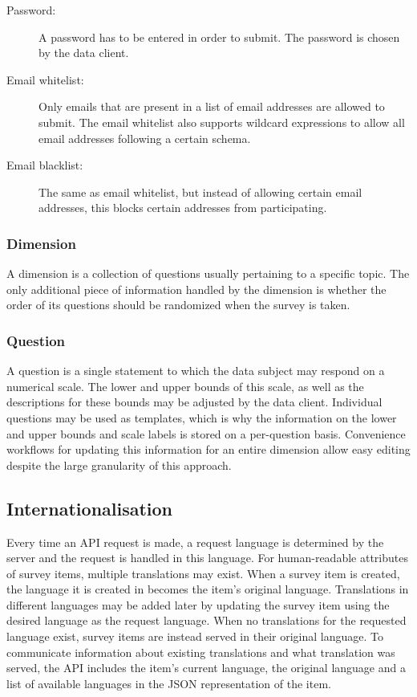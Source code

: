         \begin{description}
            \item[Password:] A password has to be entered in order to submit.
            The password is chosen by the data client.
            \item[Email whitelist:] Only emails that are present in a list
            of email addresses are allowed to submit. The email whitelist
            also supports wildcard expressions to allow all email addresses
            following a certain schema.
            \item[Email blacklist:] The same as email whitelist, but instead
            of allowing certain email addresses, this blocks certain addresses
            from participating.
        \end{description}
        
    \subsubsection{Dimension}
        A dimension is a collection of questions usually pertaining to
        a specific topic. The only additional piece of information
        handled by the dimension is whether the order of its questions
        should be randomized when the survey is taken.

    \subsubsection{Question}
        A question is a single statement to which the data subject may respond
        on a numerical scale. The lower and upper bounds of this scale,
        as well as the descriptions for these bounds may be adjusted by the data client. 
        Individual questions may be used as templates,
        which is why the information on the lower and upper bounds and scale
        labels is stored on a per-question basis. Convenience workflows
        for updating this information for an entire dimension allow
        easy editing despite the large granularity of this approach.

\subsection{Internationalisation}
    Every time an API request is made,
    a request language is determined by the server and the request is
    handled in this language.
    For human-readable attributes of survey items, multiple translations
    may exist. When a survey item is created, the language it is created
    in becomes the item's original language. Translations in different
    languages may be added later by updating the survey item using 
    the desired language as the request language. 
    When no translations for the requested language exist, survey items 
    are instead served in their original language.
    To communicate information about existing translations and
    what translation was served, the API includes the item's
    current language, the original language and a list of available languages
    in the JSON representation of the item.

